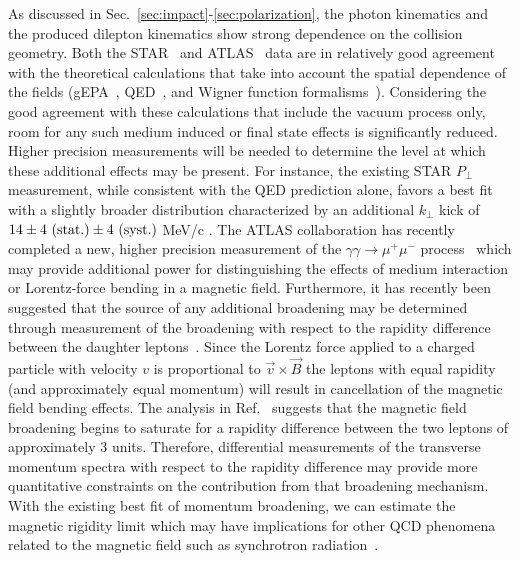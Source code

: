 \documentclass[12pt,epjc3]{svjour3}\sloppy
\begin{document}
As discussed in Sec.~\ref{sec:impact}-\ref{sec:polarization}, the photon kinematics and the produced dilepton kinematics show strong dependence on the collision geometry.
Both the STAR~\cite{starcollaborationProductionEnsuremathPairs2004} and ATLAS~\cite{atlascollaborationObservationCentralityDependentAcoplanarity2018a} data are in relatively good agreement with the theoretical calculations that take into account the spatial dependence of the fields (gEPA~\cite{zhaInitialTransversemomentumBroadening2020b}, QED~\cite{zhaInitialTransversemomentumBroadening2020b,liImpactParameterDependence2020}, and Wigner function formalisms~\cite{klusek-gawendaCentralityDependenceDilepton2021,kleinLeptonPairProduction2020a,Wang:2021kxm}).
Considering the good agreement with these calculations that include the vacuum process only, room for any such medium induced or final state effects is significantly reduced. 
Higher precision measurements will be needed to determine the level at which these additional effects may be present. 
For instance, the existing STAR $P_\perp$ measurement, while consistent with the QED prediction alone, favors a best fit with a slightly broader distribution characterized by an additional $k_\perp$ kick of $14\pm4 {\rm\ (stat.)} \pm4 {\rm\ (syst.)}$ MeV/c .
The ATLAS collaboration has recently completed a new, higher precision measurement of the $\gamma\gamma \rightarrow \mu^+\mu^-$ process~\cite{atlascollaborationExclusiveDimuonProduction2020} which may provide additional power for distinguishing the effects of medium interaction or Lorentz-force bending in a magnetic field. 
Furthermore, it has recently been suggested that the source of any additional broadening may be determined 
through measurement of the broadening with respect to the rapidity difference between the daughter leptons~\cite{kleinLeptonPairProduction2020a}.
Since the Lorentz force applied to a charged particle with velocity $v$ is proportional to $\vec{v} \times \vec{B}$ the leptons with equal rapidity (and approximately equal momentum) will result in cancellation of the magnetic field bending effects. The analysis in Ref.~\cite{kleinLeptonPairProduction2020a} suggests that the magnetic field broadening begins to saturate for a rapidity difference between the two leptons of approximately 3 units. Therefore, differential measurements of the transverse momentum spectra with respect to the rapidity difference may provide more quantitative constraints on the contribution from that broadening mechanism.
With the existing best fit of momentum broadening, we can estimate the magnetic rigidity limit which may have implications for other QCD phenomena related to the magnetic field such as synchrotron radiation~\cite{TuchinPhysRevC.82.034904}. 
\end{document}
